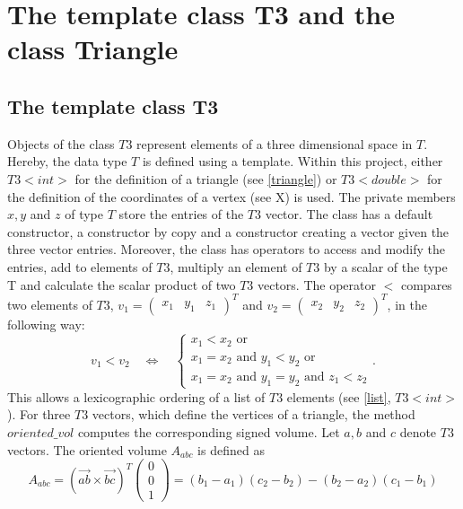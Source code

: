 \documentclass[10pt]{article}
\begin{document}
\section{The template class T3 and the class Triangle}

\subsection{The template class T3} \label{T3}

Objects of the class $T3$ represent elements of a three dimensional space in $T$. Hereby, the data type $T$ is defined using a template. Within this project, either $T3<int>$ for the definition of a triangle (see \ref{triangle}) or $T3<double>$ for the definition of the coordinates of a vertex (see X) is used. The private members $x,y$ and $z$ of type $T$ store the entries of the $T3$ vector. The class has a default constructor, a constructor by copy and a constructor creating a vector given the three vector entries. Moreover, the class has operators to access and modify the entries, add to elements of $T3$, multiply an element of $T3$ by a scalar of the type T and calculate the scalar product of two $T3$ vectors. The operator $<$ compares two elements of $T3$, $v_1 = \begin{pmatrix} x_1 & y_1 & z_1 \end{pmatrix}^T$ and $v_2 = \begin{pmatrix} x_2 & y_2 & z_2 \end{pmatrix}^T$, in the following way:
$$ v_1 < v_2 \quad \Leftrightarrow \quad \begin{cases}
 x_1 < x_2 \text{ or }\\
 x_1 = x_2 \text{ and } y_1 < y_2 \text{ or }\\
 x_1 = x_2 \text{ and } y_1 = y_2 \text{ and } z_1 < z_2
\end{cases}. $$ 
This allows a lexicographic ordering of a list of $T3$ elements (see \ref{list}, $T3<int>$). For three $T3$ vectors, which define the vertices of a triangle, the method $ oriented\_vol $ computes the corresponding signed volume. Let $a,b$ and $c$ denote $T3$ vectors. The oriented volume $A_{abc}$ is defined as
$$ A_{abc} = \left( \overrightarrow{ab} \times \overrightarrow{bc} \right)^T \begin{pmatrix} 0 \\ 0 \\ 1 \end{pmatrix} = (b_1-a_1)(c_2-b_2) - (b_2-a_2)(c_1-b_1)$$
\end{document}
